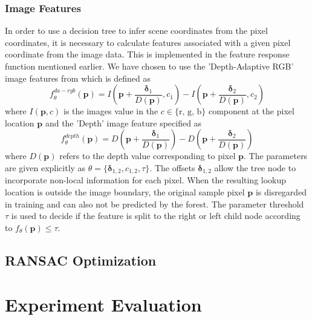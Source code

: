 \documentclass[final]{cvpr}
\begin{document}
\subsubsection{Image Features}
In order to use a decision tree to infer scene coordinates from the pixel coordinates,
it is necessary to calculate features associated with a given pixel coordinate from the
image data. This is implemented in the feature response function mentioned earlier.
We have chosen to use the 'Depth-Adaptive RGB' image features from \cite{shotton2013} which
is defined as
\begin{equation}
	f_{\theta}^{da-rgb}(\boldsymbol{p}) = I\left(\boldsymbol{p} + \frac{\boldsymbol{\delta}_1}{D(\boldsymbol{p})}, c_1\right)
	- I\left(\boldsymbol{p} + \frac{\boldsymbol{\delta}_2}{D(\boldsymbol{p})}, c_2\right)
\end{equation}
where $I(\boldsymbol{p}, c)$ is the images value in the $c \in \{\text{r, g, b}\}$ component at
the pixel location $\boldsymbol{p}$ and the 'Depth' image feature specified as
\begin{equation}
	f_{\theta}^{depth}(\boldsymbol{p}) = D\left(\boldsymbol{p} + \frac{\boldsymbol{\delta}_1}{D(\boldsymbol{p})}\right)
	- D\left(\boldsymbol{p} + \frac{\boldsymbol{\delta}_2}{D(\boldsymbol{p})}\right)
\end{equation}
where $D(\boldsymbol{p})$ refers to the depth value corresponding to pixel $\boldsymbol{p}$.
The parameters are given explicitly as $\theta = \{\boldsymbol{\delta}_{1,2}, c_{1,2}, \tau\}$. 
The offsets $\boldsymbol{\delta}_{1,2}$
allow the tree node to incorporate non-local information for each pixel. When the resulting
lookup location is outside the image boundary, the original sample pixel $\boldsymbol{p}$ is
disregarded in training and can also not be predicted by the forest. The parameter threshold 
$\tau$ is used to decide if the feature is split to the right or left child node according to 
$f_{\theta}(\boldsymbol{p}) \leq \tau$.


\subsection{RANSAC Optimization}

\section{Experiment Evaluation}
\end{document}
